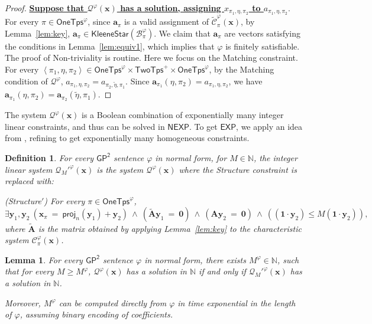 \documentclass[10pt,a4paper]{article}
\newtheorem{lemma}[theorem]{Lemma}
\newtheorem{definition}[theorem]{Definition}
\theoremstyle{definition}
\theoremstyle{remark}
\newcommand{\cB}{\mathcal{B}}
\newcommand{\cC}{\mathcal{C}}
\newcommand{\cCtilde}{\tilde{\mathcal{C}}}
\newcommand{\cQ}{\mathcal{Q}}
\newcommand{\bbN}{\mathbb{N}}
\newcommand{\bfA}{\mathbf{A}}
\newcommand{\bfAtilde}{\tilde{\mathbf{A}}}
\newcommand{\bfa}{\mathbf{a}}
\newcommand{\bfx}{\mathbf{x}}
\newcommand{\bfy}{\mathbf{y}}
\newcommand{\bfzero}{\mathbf{0}}
\newcommand{\bfone}{\mathbf{1}}
\newcommand{\mexp}  {\mathsf{EXP}}
\newcommand{\exptime}{\mexp}
\newcommand{\nexptime}  {\mathsf{NEXP}}
\newcommand{\twotypes}{\mathsf{TwoTps}}
\newcommand{\Onetypes}{\mathsf{OneTps}}
\newcommand{\GPtwo}   {\mathsf{GP^2}}
\newcommand{\tuple}[1]       {\left\langle #1 \right\rangle}
\newcommand{\projp}[2]     {\mathsf{proj}_{ #1 }\left( #2 \right)}
\newcommand{\dual}[1] {\widetilde{ #1 }}
\newcommand{\kstar}[1] {\mathsf{KleeneStar}\left( #1 \right)}
\begin{document}
\begin{proof}
    \textbf{\uline{Suppose that $\cQ^\varphi(\bfx)$ has a solution, assigning  $x_{\pi_1, \eta, \pi_2}$ to $a_{\pi_1, \eta, \pi_2}$}}.
    For every $\pi \in \Onetypes^\varphi$,
    since $\bfa_{\pi}$ is a valid assignment of $\cCtilde^\varphi_\pi(\bfx)$,
    by Lemma~\ref{lem:key},
    $\bfa_{\pi} \in \kstar{\cB^\varphi_{\pi}}$.
    We claim that $\bfa_{\pi}$ are vectors satisfying the conditions in Lemma~\ref{lem:equiv1},
    which implies that $\varphi$ is finitely satisfiable.
    The proof of Non-triviality is routine. 
    Here we focus on the Matching constraint.
    For every $\tuple{\pi_1, \eta, \pi_2} \in \Onetypes^\varphi \times \twotypes^+ \times \Onetypes^\varphi$,
    by the Matching condition of $\cQ^\varphi$,
    $a_{\pi_1, \eta, \pi_2} = a_{\pi_2, \dual{\eta}, \pi_1}$.
    Since $\bfa_{\pi_1}(\eta, \pi_2) = a_{\pi_1, \eta, \pi_2}$,
    we have $\bfa_{\pi_1}(\eta, \pi_2) = \bfa_{\pi_2}(\dual{\eta}, \pi_1)$.
\end{proof}

The system $\cQ^\varphi(\bfx)$ is a Boolean combination of exponentially many integer linear constraints, and thus can be solved in
$\nexptime$. To get $\exptime$, we apply an idea from \cite{gctwocomplexity}, refining to get exponentially many homogeneous constraints.
\begin{definition}
    For every $\GPtwo$ sentence $\varphi$ in normal form,
    for $M \in \bbN$,
    the integer linear system $\cQ_M'^\varphi(\bfx)$ is the system $\cQ^\varphi(\bfx)$
    where the Structure constraint is replaced with:
    \begin{compactitem}
        \item (Structure$'$)
            For every $\pi \in \Onetypes^\varphi$,
            \begin{equation*}
                \exists \bfy_1, \bfy_2\ 
                (\bfx_\pi\ =\ \projp{n}{\bfy_1} + \bfy_2)\ \land\ 
                (\bfAtilde\bfy_1\ =\ \bfzero)\ \land\ 
                (\bfA\bfy_2\ =\ \bfzero)\ \land\ 
                ((\bfone \cdot \bfy_2) \le M (\bfone \cdot \bfy_2)),
            \end{equation*}
            where $\bfAtilde$ is the matrix obtained by applying Lemma~\ref{lem:key}
            to the characteristic system $\cC^\varphi_\pi(\bfx)$.
    \end{compactitem}
\end{definition}

\begin{lemma}\label{lem:equiv3}
    For every $\GPtwo$ sentence $\varphi$ in normal form,
    there exists $M^\varphi \in \bbN$, such that
    for every $M \ge M^\varphi$,
    $\cQ^\varphi(\bfx)$ has a solution in $\bbN$ if and only if
    $\cQ_{M}'^\varphi(\bfx)$ has a solution in $\bbN$.

    Moreover, $M^\varphi$ can be computed directly from $\varphi$ in time exponential in the length of $\varphi$, assuming binary encoding of coefficients.
\end{lemma}
\end{document}

